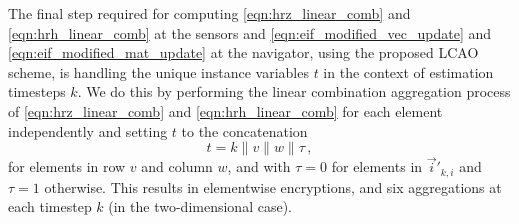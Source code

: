 \documentclass[10pt,letterpaper,oneside,twocolumn,journal]{IEEEtran}
\theoremstyle{definition}
\theoremstyle{definition}
\theoremstyle{remark}
\begin{document}
The final step required for computing \eqref{eqn:hrz_linear_comb} and \eqref{eqn:hrh_linear_comb} at the sensors and \eqref{eqn:eif_modified_vec_update} and \eqref{eqn:eif_modified_mat_update} at the navigator, using the proposed LCAO scheme, is handling the unique instance variables $t$ in the context of estimation timesteps $k$. We do this by performing the linear combination aggregation process of \eqref{eqn:hrz_linear_comb} and \eqref{eqn:hrh_linear_comb} for each element independently and setting $t$ to the concatenation
\begin{equation}
    t=k\mathbin\|v\mathbin\|w\mathbin\|\tau\,,
\end{equation}
for elements in row $v$ and column $w$, and with $\tau=0$ for elements in $\vec{i}'_{k,i}$ and $\tau=1$ otherwise. This results in elementwise encryptions, and six aggregations at each timestep $k$ (in the two-dimensional case).

% 
% 
\end{document}
